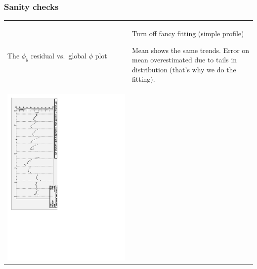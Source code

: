 \documentclass[compress]{beamer}
\begin{document}
\begin{frame}
\frametitle{Sanity checks}

\vspace{0.35 cm}
\begin{tabular}{p{0.5\linewidth} p{0.5\linewidth}}
The $\phi_y$ residual vs.~global $\phi$ plot & Turn off fancy fitting (simple profile)

\vspace{0.05 cm}
{\scriptsize Mean shows the same trends.  Error on mean overestimated due to tails in distribution (that's why we do the fitting).} \\
\vspace{0.01 cm} \includegraphics[height=\linewidth, angle=90]{possible_acoplanarity.pdf} & 

\end{tabular}
\end{frame}
\end{document}
